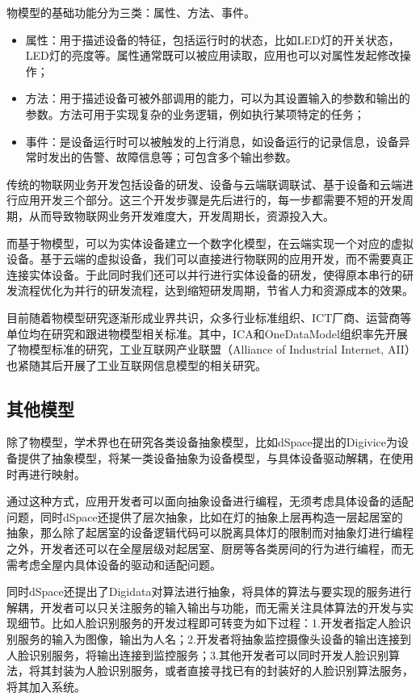 物模型的基础功能分为三类：属性、方法、事件。

\begin{itemize}
	\item 属性：用于描述设备的特征，包括运行时的状态，比如LED灯的开关状态，LED灯的亮度等。属性通常既可以被应用读取，应用也可以对属性发起修改操作；
	\item 方法：用于描述设备可被外部调用的能力，可以为其设置输入的参数和输出的参数。方法可用于实现复杂的业务逻辑，例如执行某项特定的任务；
	\item 事件：是设备运行时可以被触发的上行消息，如设备运行的记录信息，设备异常时发出的告警、故障信息等；可包含多个输出参数。
\end{itemize}

传统的物联网业务开发包括设备的研发、设备与云端联调联试、基于设备和云端进行应用开发三个部分。这三个开发步骤是先后进行的，每一步都需要不短的开发周期，从而导致物联网业务开发难度大，开发周期长，资源投入大。

而基于物模型，可以为实体设备建立一个数字化模型，在云端实现一个对应的虚拟设备。基于云端的虚拟设备，我们可以直接进行物联网的应用开发，而不需要真正连接实体设备。于此同时我们还可以并行进行实体设备的研发，使得原本串行的研发流程优化为并行的研发流程，达到缩短研发周期，节省人力和资源成本的效果。

目前随着物模型研究逐渐形成业界共识，众多行业标准组织、ICT厂商、运营商等单位均在研究和跟进物模型相关标准。其中，ICA和OneDataModel组织率先开展了物模型标准的研究\cite{aliobject, onenet}，工业互联网产业联盟（Alliance of Industrial Internet, AII）也紧随其后开展了工业互联网信息模型的相关研究。
\subsection{其他模型}
除了物模型，学术界也在研究各类设备抽象模型，比如dSpace\cite{FuRat21}提出的Digivice为设备提供了抽象模型，将某一类设备抽象为设备模型，与具体设备驱动解耦，在使用时再进行映射。

通过这种方式，应用开发者可以面向抽象设备进行编程，无须考虑具体设备的适配问题，同时dSpace还提供了层次抽象，比如在灯的抽象上层再构造一层起居室的抽象，那么除了起居室的设备逻辑代码可以脱离具体灯的限制而对抽象灯进行编程之外，开发者还可以在全屋层级对起居室、厨房等各类房间的行为进行编程，而无需考虑全屋内具体设备的驱动和适配问题。

同时dSpace还提出了Digidata对算法进行抽象，将具体的算法与要实现的服务进行解耦，开发者可以只关注服务的输入输出与功能，而无需关注具体算法的开发与实现细节。比如人脸识别服务的开发过程即可转变为如下过程：1.开发者指定人脸识别服务的输入为图像，输出为人名；2.开发者将抽象监控摄像头设备的输出连接到人脸识别服务，将输出连接到监控服务；3.其他开发者可以同时开发人脸识别算法，将其封装为人脸识别服务，或者直接寻找已有的封装好的人脸识别算法服务，将其加入系统。


